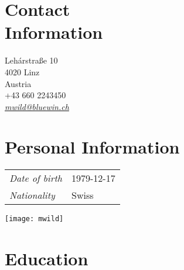 \documentclass[line,11pt,a4paper]{resume}
\newcommand{\mail}[1]{\textsl{\href{mailto:#1}{#1}}}
\begin{document}
\begin{resume}

\begin{multicols}{2}

\section{\mysidestyle Contact\\Information}\vspace{2mm}

Leh\'{a}rstra{\ss}e 10 \\
4020 Linz \\
Austria \\
+43 660 2243450 \\
\mail{mwild@bluewin.ch}

\section{\mysidestyle Personal Information}\vspace{2mm}

\begin{tabular}{@{}ll}
\textsl{Date of birth} & 1979-12-17 \\
\textsl{Nationality}   & Swiss
\end{tabular}

\columnbreak
\vspace*{-9mm}\hfill\texttt{[image: mwild]}

\end{multicols}

\section{\mysidestyle Education}\vspace{2mm}


\end{resume}
\end{document}
